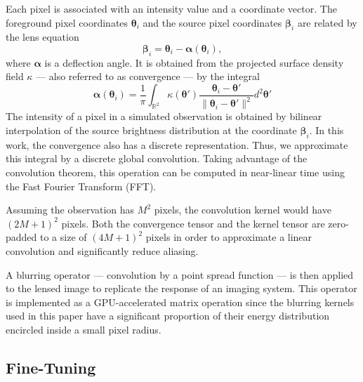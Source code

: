 \documentclass[twocolumn]{aastex631}
\begin{document}
Each pixel is associated 
with an intensity value and a coordinate vector.
The foreground pixel coordinates $\boldsymbol{\theta}_i$ and the source 
pixel coordinates $\boldsymbol{\beta}_i$ are related by
the lens equation
\begin{equation}\label{eq:LensEquation}
        \bm{\beta}_i = \bm{\theta}_i - \bm{\alpha}(\bm{\theta}_i),
\end{equation}
where $\boldsymbol{\alpha}$ is a deflection angle.
It is obtained from the projected surface 
density field $\kappa$ --- also referred to as convergence --- by the integral
\begin{equation}\label{eq:alpha}
        \bm{\alpha}(\boldsymbol{\theta}_i) = 
        \frac{1}{\pi} \int_{\mathbb{R}^2}
        \kappa(\boldsymbol{\theta}') 
        \frac{\boldsymbol{\theta}_i
        - \boldsymbol{\theta}'}{\lVert \boldsymbol{\theta}_i - 
        \boldsymbol{\theta}' \rVert^2}
        d^2\boldsymbol{\theta}'
\end{equation}
The intensity of a pixel in a simulated observation
is obtained by bilinear interpolation of the 
source brightness distribution at the coordinate $\boldsymbol{\beta}_i$.
In this work, the convergence also has a discrete representation. Thus, 
we approximate this integral by a discrete global convolution. Taking 
advantage of the convolution theorem, this operation 
can be computed in near-linear time using 
the Fast Fourier Transform (FFT). 

Assuming the observation 
has $M^2$ pixels, the convolution kernel %
would have $(2M + 1)^{2}$ pixels. 
Both the convergence tensor and the kernel tensor are zero-padded 
to a size of $(4M+1)^{2}$ pixels in order to approximate a linear 
convolution and significantly reduce aliasing.

A blurring operator --- convolution by a point spread function --- is then 
applied to the lensed image to replicate the response of an imaging system. 
This operator is implemented as a GPU-accelerated matrix operation 
since the blurring kernels used in this paper have a significant proportion
of their energy distribution encircled inside a small pixel radius. 

\subsection{Fine-Tuning}\label{sec:fine-tuning}
\end{document}
